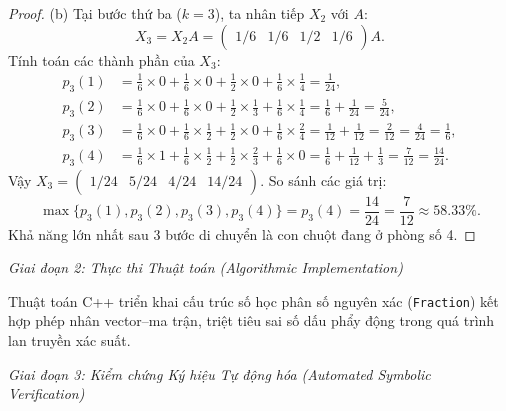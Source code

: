 \documentclass{article}
\begin{document}
\begin{proof}
	(b) Tại bước thứ ba ($k = 3$), ta nhân tiếp $X_2$ với $A$:
	\begin{equation*}
		X_3 = X_2 A = \begin{pmatrix} 1/6 & 1/6 & 1/2 & 1/6 \end{pmatrix} A.
	\end{equation*}
	Tính toán các thành phần của $X_3$:
	\begin{align*}
		p_3(1) &= \frac{1}{6} \times 0 + \frac{1}{6} \times 0 + \frac{1}{2} \times 0 + \frac{1}{6} \times \frac{1}{4} = \frac{1}{24}, \\
		p_3(2) &= \frac{1}{6} \times 0 + \frac{1}{6} \times 0 + \frac{1}{2} \times \frac{1}{3} + \frac{1}{6} \times \frac{1}{4} = \frac{1}{6} + \frac{1}{24} = \frac{5}{24}, \\
		p_3(3) &= \frac{1}{6} \times 0 + \frac{1}{6} \times \frac{1}{2} + \frac{1}{2} \times 0 + \frac{1}{6} \times \frac{2}{4} = \frac{1}{12} + \frac{1}{12} = \frac{2}{12} = \frac{4}{24} = \frac{1}{6}, \\
		p_3(4) &= \frac{1}{6} \times 1 + \frac{1}{6} \times \frac{1}{2} + \frac{1}{2} \times \frac{2}{3} + \frac{1}{6} \times 0 = \frac{1}{6} + \frac{1}{12} + \frac{1}{3} = \frac{7}{12} = \frac{14}{24}.
	\end{align*}
	Vậy $X_3 = \begin{pmatrix} 1/24 & 5/24 & 4/24 & 14/24 \end{pmatrix}$. So sánh các giá trị:
	\begin{equation*}
		\max\{p_3(1), p_3(2), p_3(3), p_3(4)\} = p_3(4) = \frac{14}{24} = \frac{7}{12} \approx 58.33\%.
	\end{equation*}
	Khả năng lớn nhất sau 3 bước di chuyển là con chuột đang ở phòng số 4.
\end{proof}

\vspace{0.5em}\noindent\emph{Giai đoạn 2: Thực thi Thuật toán (Algorithmic Implementation)}

Thuật toán C++ triển khai cấu trúc số học phân số nguyên xác (\texttt{Fraction}) kết hợp phép nhân vector--ma trận, triệt tiêu sai số dấu phẩy động trong quá trình lan truyền xác suất.



\vspace{0.5em}\noindent\emph{Giai đoạn 3: Kiểm chứng Ký hiệu Tự động hóa (Automated Symbolic Verification)}
\end{document}
